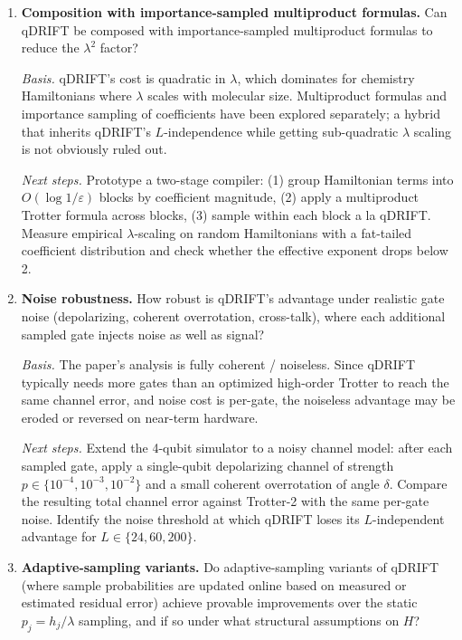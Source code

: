 \begin{enumerate}
  \item \textbf{Composition with importance-sampled multiproduct formulas.}
    Can qDRIFT be composed with importance-sampled multiproduct formulas to
    reduce the $\lambda^2$ factor?

    \emph{Basis.} qDRIFT's cost is quadratic in $\lambda$, which dominates
    for chemistry Hamiltonians where $\lambda$ scales with molecular size.
    Multiproduct formulas and importance sampling of coefficients have been
    explored separately; a hybrid that inherits qDRIFT's $L$-independence
    while getting sub-quadratic $\lambda$ scaling is not obviously ruled out.

    \emph{Next steps.} Prototype a two-stage compiler:
    (1) group Hamiltonian terms into $O(\log 1/\varepsilon)$ blocks by
    coefficient magnitude, (2) apply a multiproduct Trotter formula across
    blocks, (3) sample within each block a la qDRIFT. Measure empirical
    $\lambda$-scaling on random Hamiltonians with a fat-tailed coefficient
    distribution and check whether the effective exponent drops below 2.

  \item \textbf{Noise robustness.} How robust is qDRIFT's advantage under
    realistic gate noise (depolarizing, coherent overrotation, cross-talk),
    where each additional sampled gate injects noise as well as signal?

    \emph{Basis.} The paper's analysis is fully coherent / noiseless. Since
    qDRIFT typically needs more gates than an optimized high-order Trotter to
    reach the same channel error, and noise cost is per-gate, the noiseless
    advantage may be eroded or reversed on near-term hardware.

    \emph{Next steps.} Extend the 4-qubit simulator to a noisy channel model:
    after each sampled gate, apply a single-qubit depolarizing channel of
    strength $p \in \{10^{-4}, 10^{-3}, 10^{-2}\}$ and a small coherent
    overrotation of angle $\delta$. Compare the resulting total channel error
    against Trotter-2 with the same per-gate noise. Identify the noise
    threshold at which qDRIFT loses its $L$-independent advantage for
    $L \in \{24, 60, 200\}$.

  \item \textbf{Adaptive-sampling variants.} Do adaptive-sampling variants of
    qDRIFT (where sample probabilities are updated online based on measured
    or estimated residual error) achieve provable improvements over the
    static $p_j = h_j / \lambda$ sampling, and if so under what structural
    assumptions on $H$?


\end{enumerate}

